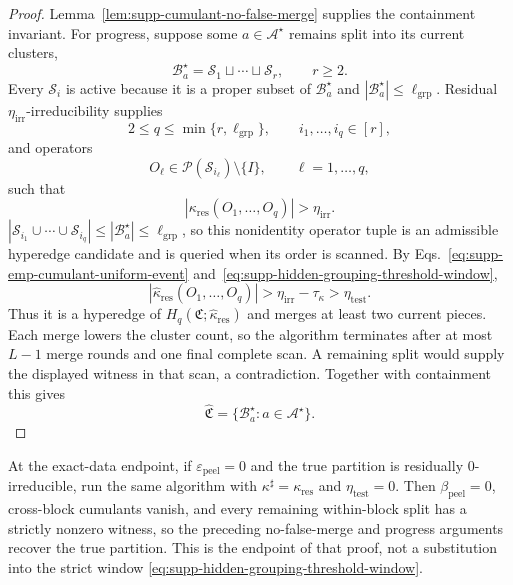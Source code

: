 \documentclass[
  aps,
  prx,
  reprint,
  superscriptaddress,
  amsmath,
  amssymb,
  nofootinbib,
  longbibliography
]{revtex4-2}
\begin{document}
\begin{proof}
Lemma~\ref{lem:supp-cumulant-no-false-merge} supplies the containment
invariant.  For progress, suppose some $a\in\mathcal A^\star$ remains split
into its current clusters,
\begin{equation}
\mathcal B_a^\star
=
\mathcal S_1\sqcup\cdots\sqcup\mathcal S_r,
\qquad r\ge 2.
\end{equation}
Every $\mathcal S_i$ is active because it is a proper subset of
$\mathcal B_a^\star$ and
$|\mathcal B_a^\star|\le\ell_{\mathrm{grp}}$.  Residual
$\eta_{\mathrm{irr}}$-irreducibility supplies
\begin{equation}
2\le q\le\min\{r,\ell_{\mathrm{grp}}\},
\qquad
i_1,\dots,i_q\in[r],
\end{equation}
and operators
\begin{equation}
O_\ell
\in
\mathcal P(\mathcal S_{i_\ell})\setminus\{I\},
\qquad
\ell=1,\dots,q,
\end{equation}
such that
\begin{equation}
\left|
\kappa_{\mathrm{res}}(O_1,\dots,O_q)
\right|
>
\eta_{\mathrm{irr}} .
\end{equation}
$|\mathcal S_{i_1}\cup\cdots\cup\mathcal S_{i_q}|\le|\mathcal B_a^\star|
\le\ell_{\mathrm{grp}}$, so this nonidentity operator tuple is an admissible
hyperedge candidate and is queried when its order is scanned.
By Eqs.~\eqref{eq:supp-emp-cumulant-uniform-event}
and~\eqref{eq:supp-hidden-grouping-threshold-window},
\begin{equation}
\left|
\widehat\kappa_{\mathrm{res}}(O_1,\dots,O_q)
\right|
>
\eta_{\mathrm{irr}}-\tau_\kappa
>
\eta_{\mathrm{test}} .
\end{equation}
Thus it is a hyperedge of
$H_q(\mathfrak C;\widehat\kappa_{\mathrm{res}})$ and merges at least two
current pieces.  Each merge lowers the cluster count, so the algorithm
terminates after at most $L-1$ merge rounds and one final complete scan.  A
remaining split would supply the displayed witness in that scan, a
contradiction.  Together with containment this gives
\begin{equation}
\widehat{\mathfrak C}
=
\{\mathcal B_a^\star:a\in\mathcal A^\star\}.
\end{equation}
\end{proof}

At the exact-data endpoint, if $\varepsilon_{\mathrm{peel}}=0$ and the true
partition is residually $0$-irreducible, run the same algorithm with
$\kappa^\sharp=\kappa_{\mathrm{res}}$ and $\eta_{\mathrm{test}}=0$.
Then $\beta_{\mathrm{peel}}=0$, cross-block cumulants vanish, and every
remaining within-block split has a strictly nonzero witness, so the preceding
no-false-merge and progress arguments recover the true partition.  This is
the endpoint of that proof, not a substitution into the strict window
\eqref{eq:supp-hidden-grouping-threshold-window}.
\end{document}
